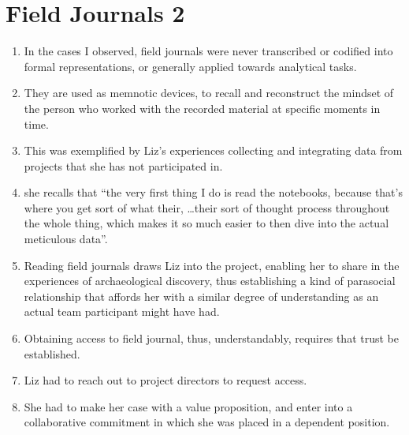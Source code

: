 \documentclass[12pt]{article}
\begin{document}
\section{Field Journals 2}
\begin{enumerate}
  \item In the cases I observed, field journals were never transcribed or codified into formal representations, or generally applied towards analytical tasks.
  \item They are used as memnotic devices, to recall and reconstruct the mindset of the person who worked with the recorded material at specific moments in time.
  \item This was exemplified by Liz's experiences collecting and integrating data from projects that she has not participated in.
  \item she recalls that ``the very first thing I do is read the notebooks, because that’s where you get sort of what their, \dots their sort of thought process throughout the whole thing, which makes it so much easier to then dive into the actual meticulous data''.
  \item Reading field journals draws Liz into the project, enabling her to share in the experiences of archaeological discovery, thus establishing a kind of parasocial relationship that affords her with a similar degree of understanding as an actual team participant might have had.
  \item Obtaining access to field journal, thus, understandably, requires that trust be established.
  \item Liz had to reach out to project directors to request access.
  \item She had to make her case with a value proposition, and enter into a collaborative commitment in which she was placed in a dependent position.
  

\end{enumerate}
\end{document}
